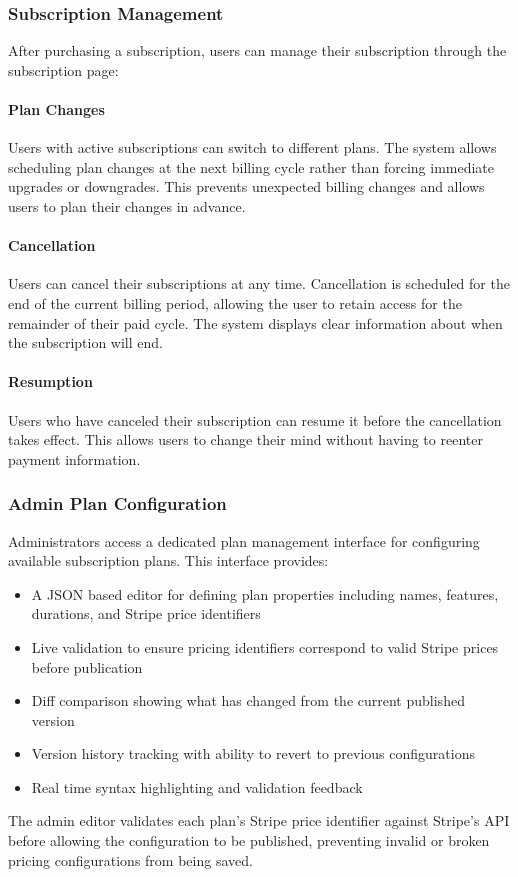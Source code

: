 \subsubsection{Subscription Management}

After purchasing a subscription, users can manage their subscription through the subscription page:

\paragraph{Plan Changes}

Users with active subscriptions can switch to different plans. The system allows scheduling plan changes at the next billing cycle rather than forcing immediate upgrades or downgrades. This prevents unexpected billing changes and allows users to plan their changes in advance.

\paragraph{Cancellation}

Users can cancel their subscriptions at any time. Cancellation is scheduled for the end of the current billing period, allowing the user to retain access for the remainder of their paid cycle. The system displays clear information about when the subscription will end.

\paragraph{Resumption}

Users who have canceled their subscription can resume it before the cancellation takes effect. This allows users to change their mind without having to reenter payment information.

\subsubsection{Admin Plan Configuration}

Administrators access a dedicated plan management interface for configuring available subscription plans. This interface provides:

\begin{itemize}
    \item A JSON based editor for defining plan properties including names, features, durations, and Stripe price identifiers
    \item Live validation to ensure pricing identifiers correspond to valid Stripe prices before publication
    \item Diff comparison showing what has changed from the current published version
    \item Version history tracking with ability to revert to previous configurations
    \item Real time syntax highlighting and validation feedback
\end{itemize}

The admin editor validates each plan's Stripe price identifier against Stripe's API before allowing the configuration to be published, preventing invalid or broken pricing configurations from being saved.
